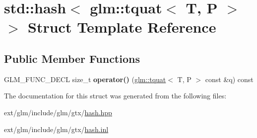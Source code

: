 \hypertarget{structstd_1_1hash_3_01glm_1_1tquat_3_01_t_00_01_p_01_4_01_4}{\section{std\-:\-:hash$<$ glm\-:\-:tquat$<$ T, P $>$ $>$ Struct Template Reference}
\label{structstd_1_1hash_3_01glm_1_1tquat_3_01_t_00_01_p_01_4_01_4}
}
\subsection*{Public Member Functions}
\begin{DoxyCompactItemize}
\item 
\hypertarget{structstd_1_1hash_3_01glm_1_1tquat_3_01_t_00_01_p_01_4_01_4_ab55fcb25f5317122e36212573b375525}{G\-L\-M\-\_\-\-F\-U\-N\-C\-\_\-\-D\-E\-C\-L size\-\_\-t {\bfseries operator()} (\hyperlink{structglm_1_1tquat}{glm\-::tquat}$<$ T, P $>$ const \&q) const }\label{structstd_1_1hash_3_01glm_1_1tquat_3_01_t_00_01_p_01_4_01_4_ab55fcb25f5317122e36212573b375525}

\end{DoxyCompactItemize}


The documentation for this struct was generated from the following files\-:\begin{DoxyCompactItemize}
\item 
ext/glm/include/glm/gtx/\hyperlink{hash_8hpp}{hash.\-hpp}\item 
ext/glm/include/glm/gtx/\hyperlink{hash_8inl}{hash.\-inl}\end{DoxyCompactItemize}
